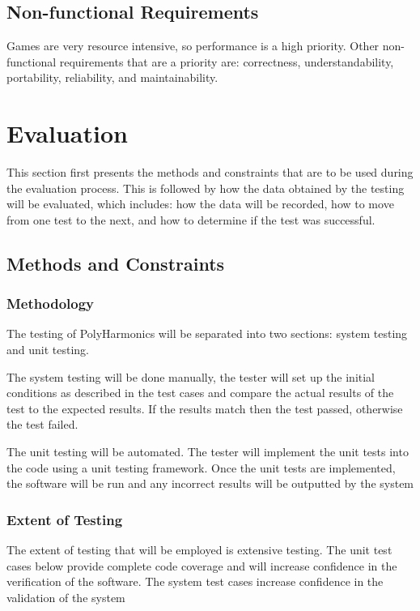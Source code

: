 \documentclass[12pt]{article}
\newcommand{\progname}{PolyHarmonics}
\begin{document}
\subsection{Non-functional Requirements}
Games are very resource intensive, so performance is a high priority.
Other non-functional requirements that are a priority are: correctness,
understandability, portability, reliability, and maintainability. 


%
%

\section{Evaluation}
This section first presents the methods and constraints that are to be used during
the evaluation process. This is followed by how the data obtained by the testing will be 
evaluated, which includes: how the data will be recorded, how to move from one test
to the next, and how to determine if the test was successful. 

\subsection{ Methods and Constraints} 

\subsubsection{Methodology} 
The testing of \progname{} will be separated into two sections: system testing and unit testing.

The system testing will be done manually, the tester will set up the initial conditions as described in the test cases
and compare the actual results of the test to the expected results. If the results match then the test passed, otherwise
the test failed.  

The unit testing will be automated. The tester will implement the unit tests into the code using a unit testing framework. Once 
the unit tests are implemented, the software will be run and any incorrect results will be outputted by the system

\subsubsection{Extent of Testing}
The extent of testing that will be employed is extensive testing. The unit test cases below provide complete code coverage and 
will increase confidence in the verification of the software. The system test cases increase confidence in the validation of the system
\end{document}
